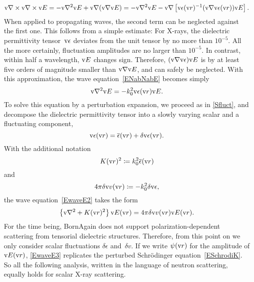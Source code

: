 \begin{equation}
  \text{v}{\nabla}\times\text{v}{\nabla}\times\text{v}{E}
  = - \text{v}{\nabla}^2\text{v}{E} + \text{v}{\nabla}(\text{v}{\nabla}\text{v}{E})
  = - \text{v}{\nabla}^2\text{v}{E} - \text{v}{\nabla}\left[\text{v}{\epsilon}(\text{v}{r})^{-1}(\text{v}{\nabla}\text{v}\epsilon(\text{v}{r}))\text{v}{E}\right].
\end{equation}
When applied to propagating waves, the second term can be neglected against the first one.
This follows from a simple estimate:
For X-rays, the dielectric permittivity tensor~$\text{v}{\epsilon}$
%
%
deviates from the unit tensor by no more than $10^{-5}$.
All the more certainly, fluctuation amplitudes are no larger than $10^{-5}$.
In contrast, within half a wavelength, $\text{v}{E}$ changes sign.
Therefore, $(\text{v}{\nabla}\text{v}{\epsilon})\text{v}{E}$ is by at least five orders of magnitude
smaller than $\text{v}{\nabla}\text{v}{E}$,
and can safely be neglected.
With this approximation, the wave equation~\cref{ENabNabE} becomes simply
\begin{equation}\label{EwaveE2}
  \text{v}{\nabla}^2\text{v}{E}
  = -k_0^2\text{v}{\epsilon}(\text{v}{r})\text{v}{E}.
\end{equation}
To solve this equation by a perturbation expansion,
we proceed as in \cref{Sfluct},
and decompose the dielectric permittivity tensor
into a slowly varying scalar and a fluctuating component,
\begin{equation}
  \text{v}{\epsilon}(\text{v}{r}) = \overline{\epsilon}(\text{v}{r}) + \delta\text{v}{\epsilon}(\text{v}{r}).
\end{equation}
With the additional notation
\begin{equation}
  K(\text{v}{r})^2 \coloneqq k_0^2 \overline{\epsilon}(\text{v}{r})
\end{equation}
and
\begin{equation}
  4\pi\delta\text{v}{v}(\text{v}{r}) \coloneqq - k_0^2\delta\text{v}{\epsilon},
\end{equation}
the wave equation~\cref{EwaveE2} takes the form
\begin{equation}\label{EwaveE3}
  \left\{\text{v}{\nabla}^2 + K(\text{v}{r})^2\right\}\text{v}{E}(\text{v}{r})
  = 4\pi\delta\text{v}{v}(\text{v}{r})\text{v}{E}(\text{v}{r}).
\end{equation}
For the time being,
BornAgain does not support polarization-dependent scattering
%
from tensorial dielectric structures.
Therefore, from this point on we only consider scalar fluctuations
$\delta\epsilon$ and~$\delta v$.
If we write $\psi(\text{v}{r})$ for the amplitude of $\text{v}{E}(\text{v}{r})$,
\cref{EwaveE3} replicates the perturbed Schrödinger equation~\cref{ESchrodiK}.
%
So all the following analysis,
written in the language of neutron scattering,
equally holds for scalar X-ray scattering.

